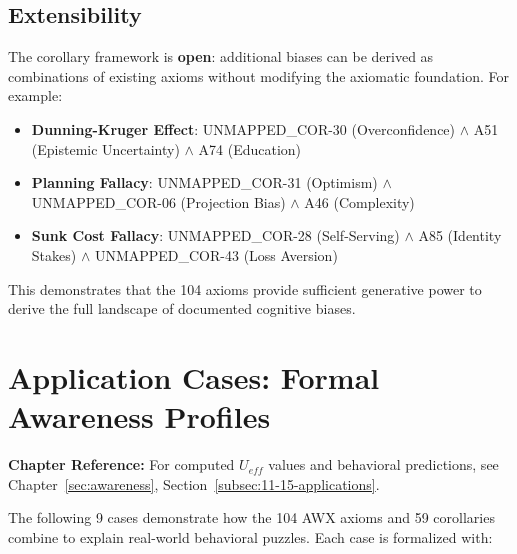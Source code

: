 \subsection{Extensibility}

The corollary framework is \textbf{open}: additional biases can be derived as combinations of existing axioms without modifying the axiomatic foundation. For example:

\begin{itemize}
    \item \textbf{Dunning-Kruger Effect}: UNMAPPED_COR-30 (Overconfidence) $\land$ A51 (Epistemic Uncertainty) $\land$ A74 (Education)
    \item \textbf{Planning Fallacy}: UNMAPPED_COR-31 (Optimism) $\land$ UNMAPPED_COR-06 (Projection Bias) $\land$ A46 (Complexity)
    \item \textbf{Sunk Cost Fallacy}: UNMAPPED_COR-28 (Self-Serving) $\land$ A85 (Identity Stakes) $\land$ UNMAPPED_COR-43 (Loss Aversion)
\end{itemize}

This demonstrates that the 104 axioms provide sufficient generative power to derive the full landscape of documented cognitive biases.




\section{Application Cases: Formal Awareness Profiles}
\label{sec:application-cases}

\begin{cross-reference}
\textbf{Chapter Reference:} For computed $U_{eff}$ values and behavioral 
predictions, see Chapter~\ref{sec:awareness}, 
Section~\ref{subsec:11-15-applications}.
\end{cross-reference}

The following 9 cases demonstrate how the 104 AWX axioms and 59 corollaries combine to explain real-world behavioral puzzles. Each case is formalized with:

